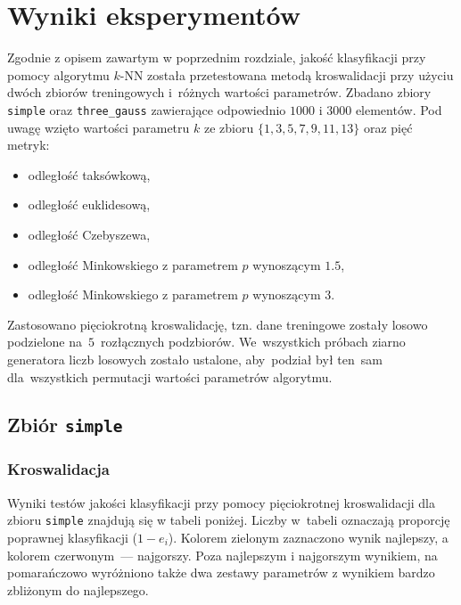 \documentclass[11pt,a4paper]{article}
\begin{document}
\section{Wyniki eksperymentów}

Zgodnie z opisem zawartym w poprzednim rozdziale, jakość klasyfikacji przy pomocy algorytmu $k$-NN została przetestowana metodą kroswalidacji przy użyciu dwóch zbiorów treningowych i~różnych wartości parametrów. Zbadano zbiory {\tt simple} oraz {\tt three\_gauss} zawierające odpowiednio $1000$ i $3000$ elementów. Pod uwagę wzięto wartości parametru $k$ ze zbioru $\{1, 3, 5, 7, 9, 11, 13\}$ oraz pięć metryk:
\begin{itemize}
    \setlength\itemsep{-.4em}
    \item odległość taksówkową,
    \item odległość euklidesową,
    \item odległość Czebyszewa,
    \item odległość Minkowskiego z parametrem $p$ wynoszącym $1.5$,
    \item odległość Minkowskiego z parametrem $p$ wynoszącym $3$.
\end{itemize}
Zastosowano pięciokrotną kroswalidację, tzn. dane treningowe zostały losowo podzielone na~$5$~rozłącznych podzbiorów.
We~wszystkich próbach ziarno generatora liczb losowych zostało ustalone, aby~podział był ten~sam dla~wszystkich permutacji wartości parametrów algorytmu.

\subsection{Zbiór {\tt simple}}

\subsubsection{Kroswalidacja}

Wyniki testów jakości klasyfikacji przy pomocy pięciokrotnej kroswalidacji dla zbioru {\tt simple} znajdują się w tabeli poniżej.
Liczby w~tabeli oznaczają proporcję poprawnej klasyfikacji ($1 - e_i$).
Kolorem zielonym zaznaczono wynik najlepszy, a kolorem czerwonym~--- najgorszy. Poza najlepszym i najgorszym wynikiem, na pomarańczowo wyróżniono także dwa zestawy parametrów z wynikiem bardzo zbliżonym do najlepszego.
\end{document}
